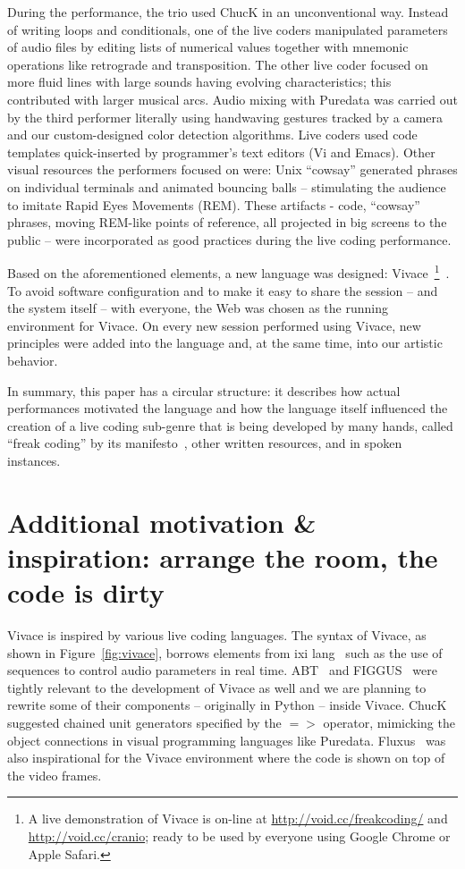 \documentclass[letterpaper, 12pt]{article}
\begin{document}
During the performance, the trio used ChucK in an unconventional
way. Instead of writing loops and conditionals, one of the live coders
manipulated parameters of audio files by editing lists of numerical
values together with mnemonic operations like retrograde and
transposition.  The other live coder focused on more fluid lines with
large sounds having evolving characteristics; this contributed with
larger musical arcs.  Audio mixing with Puredata was carried out by
the third performer literally using handwaving gestures tracked by a
camera and our custom-designed color detection algorithms. Live coders
used code templates quick-inserted by programmer's text editors (Vi
and Emacs). Other visual resources the performers focused on were:
Unix ``cowsay'' generated phrases on individual terminals and animated
bouncing balls -- stimulating the audience to imitate Rapid Eyes
Movements (REM). These artifacts - code, ``cowsay'' phrases, moving
REM-like points of reference, all projected in big screens to the
public -- were incorporated as good practices during the live coding
performance.

Based on the aforementioned elements, a new language was designed:
Vivace~\footnote{A live demonstration of Vivace is on-line at
    \url{http://void.cc/freakcoding/} and \url{http://void.cc/cranio}; ready to be used by everyone using
  Google Chrome or Apple Safari.}~\citep*{Vivace}.  To avoid software
configuration and to make it easy to share the session -- and the
system itself -- with everyone, the Web was chosen as the running
environment for Vivace. On every new session performed using Vivace,
new principles were added into the language and, at the same time,
into our artistic behavior.

In summary, this paper has a circular structure: it describes how
actual performances motivated the language and how the language itself
influenced the creation of a live coding sub-genre that is being
developed by many hands, called ``freak coding'' by its
manifesto~\citep*{freak}, other written resources, and in spoken
instances.

\parskip 18pt

\section{Additional motivation \& inspiration: arrange the room, the code is dirty}

Vivace is inspired by various live coding languages. The syntax of
Vivace, as shown in Figure~\ref{fig:vivace}, borrows elements from ixi
lang~\citep{magnusson2011ixi} such as the use of sequences to control
audio parameters in real time. ABT~\citep{fabbri} and
FIGGUS~\citep{fabbri2} were tightly relevant to the development of
Vivace as well and we are planning to rewrite some of their components
-- originally in Python -- inside Vivace. ChucK suggested chained unit
generators specified by the $=>$ operator, mimicking the object
connections in visual programming languages like
Puredata. Fluxus~\citep{fluxus} was also inspirational for the Vivace
environment where the code is shown on top of the video frames.
\end{document}
